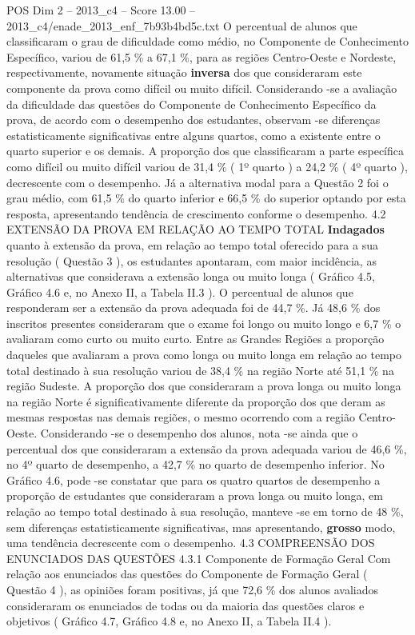 \begin{textsample}{POS Dim 2 – 2013\_c4 – Score 13.00 – 2013\_c4/enade\_2013\_enf\_7b93b4bd5c.txt}
O percentual de alunos que classificaram o grau de dificuldade como médio, no Componente de Conhecimento Específico, variou de 61,5 \% a 67,1 \%, para as regiões Centro-Oeste e Nordeste, respectivamente, novamente situação \textbf{inversa} dos que consideraram este componente da prova como difícil ou muito difícil.
Considerando -se a avaliação da dificuldade das questões do Componente de Conhecimento Específico da prova, de acordo com o desempenho dos estudantes, observam -se diferenças estatisticamente significativas entre alguns quartos, como a existente entre o quarto superior e os demais.
A proporção dos que classificaram a parte específica como difícil ou muito difícil variou de 31,4 \% ( 1º quarto ) a 24,2 \% ( 4º quarto ), decrescente com o desempenho.
Já a alternativa modal para a Questão 2 foi o grau médio, com 61,5 \% do quarto inferior e 66,5 \% do superior optando por esta resposta, apresentando tendência de crescimento conforme o desempenho. 4.2 EXTENSÃO DA PROVA EM RELAÇÃO AO TEMPO TOTAL \textbf{Indagados} quanto à extensão da prova, em relação ao tempo total oferecido para a sua resolução ( Questão 3 ), os estudantes apontaram, com maior incidência, as alternativas que considerava a extensão longa ou muito longa ( Gráfico 4.5, Gráfico 4.6 e, no Anexo II, a Tabela II.3 ).
O percentual de alunos que responderam ser a extensão da prova adequada foi de 44,7 \%.
Já 48,6 \% dos inscritos presentes consideraram que o exame foi longo ou muito longo e 6,7 \% o avaliaram como curto ou muito curto.
Entre as Grandes Regiões a proporção daqueles que avaliaram a prova como longa ou muito longa em relação ao tempo total destinado à sua resolução variou de 38,4 \% na região Norte até 51,1 \% na região Sudeste.
A proporção dos que consideraram a prova longa ou muito longa na região Norte é significativamente diferente da proporção dos que deram as mesmas respostas nas demais regiões, o mesmo ocorrendo com a região Centro-Oeste.
Considerando -se o desempenho dos alunos, nota -se ainda que o percentual dos que consideraram a extensão da prova adequada variou de 46,6 \%, no 4º quarto de desempenho, a 42,7 \% no quarto de desempenho inferior.
No Gráfico 4.6, pode -se constatar que para os quatro quartos de desempenho a proporção de estudantes que consideraram a prova longa ou muito longa, em relação ao tempo total destinado à sua resolução, manteve -se em torno de 48 \%, sem diferenças estatisticamente significativas, mas apresentando, \textbf{grosso} modo, uma tendência decrescente com o desempenho. 4.3 COMPREENSÃO DOS ENUNCIADOS DAS QUESTÕES 4.3.1 Componente de Formação Geral Com relação aos enunciados das questões do Componente de Formação Geral ( Questão 4 ), as opiniões foram positivas, já que 72,6 \% dos alunos avaliados consideraram os enunciados de todas ou da maioria das questões claros e objetivos ( Gráfico 4.7, Gráfico 4.8 e, no Anexo II, a Tabela II.4 ).

\end{textsample}
